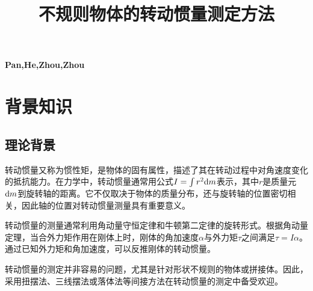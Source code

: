 \documentclass[12pt,hyperref,a4paper,UTF8]{ctexart}
\begin{document}
\cover

%
%

\thispagestyle{empty} %

\newpage
\begin{spacing}{2}
\tableofcontents
\end{spacing}
\thispagestyle{empty}
\paragraph{}
\newpage


\begin{center}
    \title{ \Huge \textbf{{不规则物体的转动惯量测定方法}}}
\end{center}
\par
\begin{center}
    \textbf{Pan,He,Zhou,Zhou}
\end{center}
\paragraph{}

\section{背景知识}
\subsection{理论背景}

转动惯量又称为惯性矩，是物体的固有属性，描述了其在转动过程中对角速度变化的抵抗能力。在力学中，转动惯量通常用公式$I=\int r^2\text dm$表示，其中$r$是质量元$\text dm$到旋转轴的距离。它不仅取决于物体的质量分布，还与旋转轴的位置密切相关，因此轴的位置对转动惯量测量具有重要意义。

转动惯量的测量通常利用角动量守恒定律和牛顿第二定律的旋转形式。根据角动量定理，当合外力矩作用在刚体上时，刚体的角加速度$\alpha$与外力矩$\tau$之间满足$\tau=I\alpha$。通过已知外力矩和角加速度，可以反推刚体的转动惯量。

转动惯量的测定并非容易的问题，尤其是针对形状不规则的物体或拼接体。因此，采用扭摆法、三线摆法或落体法等间接方法在转动惯量的测定中备受欢迎。
\end{document}
